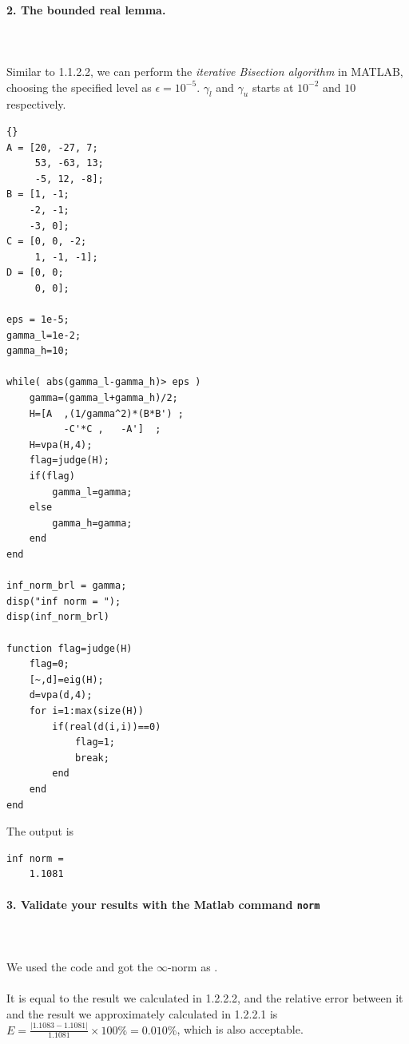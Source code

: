 \documentclass{article}
\begin{document}
\paragraph{2. The bounded real lemma.}~\\~\\
Similar to 1.1.2.2, we can perform the \textit{iterative Bisection algorithm} in MATLAB, choosing the specified level as $\epsilon=10^{-5}$. $\gamma_l$ and $\gamma_u$ starts at $10^{-2}$ and $10$ respectively.
\begin{lstlisting}{}
A = [20, -27, 7;
     53, -63, 13;
     -5, 12, -8];
B = [1, -1;
    -2, -1;
    -3, 0];
C = [0, 0, -2;
     1, -1, -1];
D = [0, 0;
     0, 0];

eps = 1e-5;
gamma_l=1e-2; 
gamma_h=10;

while( abs(gamma_l-gamma_h)> eps )
    gamma=(gamma_l+gamma_h)/2;
    H=[A  ,(1/gamma^2)*(B*B') ;
          -C'*C ,   -A']  ;
    H=vpa(H,4);
    flag=judge(H);
    if(flag)  
        gamma_l=gamma;
    else
        gamma_h=gamma;
    end
end

inf_norm_brl = gamma;
disp("inf norm = ");
disp(inf_norm_brl)

function flag=judge(H)
    flag=0;
    [~,d]=eig(H); 
    d=vpa(d,4);
    for i=1:max(size(H))
        if(real(d(i,i))==0) 
            flag=1;
            break;
        end
    end
end
\end{lstlisting}
The output is 
\begin{lstlisting}[numbers=none]
inf norm = 
    1.1081
\end{lstlisting}

\paragraph{3. Validate your results with the Matlab command \texttt{norm} }~\\~\\
We used the code  and got the $\infty$-norm as .~\\~\\
It is equal to the result we calculated in 1.2.2.2, and the relative error between it and the result we approximately calculated in 1.2.2.1 is $E=\frac{|1.1083-1.1081|}{1.1081}\times 100\%=0.010\%$, which is also acceptable.
\end{document}
